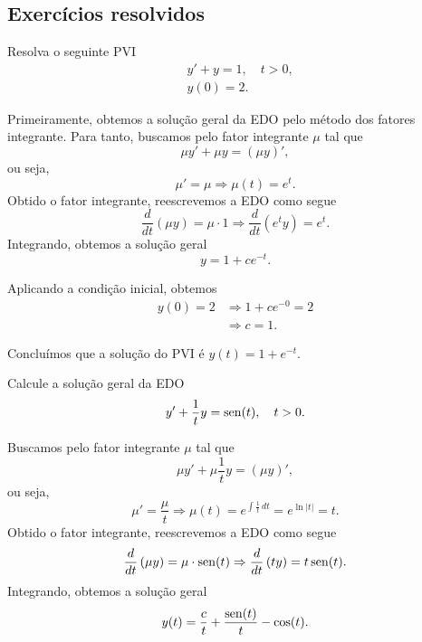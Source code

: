 \subsection*{Exercícios resolvidos}

\begin{exeresol}
  Resolva o seguinte PVI
  \begin{align}
    &y' + y = 1, \quad t>0,\\
    &y(0) = 2.
  \end{align}
\end{exeresol}
\begin{resol}
  Primeiramente, obtemos a solução geral da EDO pelo método dos fatores integrante. Para tanto, buscamos pelo fator integrante $\mu$ tal que
  \begin{equation}
    \mu y' + \mu y = (\mu y)',
  \end{equation}
  ou seja,
  \begin{equation}
    \mu' = \mu \Rightarrow \mu(t) = e^{t}.
  \end{equation}
  Obtido o fator integrante, reescrevemos a EDO como segue
  \begin{equation}
    \frac{d}{dt}\left(\mu y\right) = \mu\cdot 1 \Rightarrow \frac{d}{dt}\left(e^ty\right) = e^t.
  \end{equation}
  Integrando, obtemos a solução geral
  \begin{equation}
    y = 1 + ce^{-t}.
  \end{equation}

  Aplicando a condição inicial, obtemos
  \begin{align}
    y(0) = 2 &\Rightarrow 1 + ce^{-0} = 2 \\
             &\Rightarrow c = 1.
  \end{align}

  Concluímos que a solução do PVI é $y(t) = 1 + e^{-t}$.
\end{resol}

\begin{exeresol}
  Calcule a solução geral da EDO
  \begin{align}
    y' + \frac{1}{t}y = \operatorname{sen}(t),\quad t>0.
  \end{align}
\end{exeresol}
\begin{resol}
  Buscamos pelo fator integrante $\mu$ tal que
  \begin{equation}
    \mu y' + \mu \frac{1}{t}y = (\mu y)',
  \end{equation}
  ou seja,
  \begin{equation}
    \mu' = \frac{\mu}{t} \Rightarrow \mu(t) = e^{\int \frac{1}{t}\,dt} = e^{\ln|t|} = t.
  \end{equation}
  Obtido o fator integrante, reescrevemos a EDO como segue
  \begin{equation}
    \frac{d}{dt}\left(\mu y\right) = \mu\cdot \operatorname{sen}(t) \Rightarrow \frac{d}{dt}\left(t y\right) = t\operatorname{sen}(t).
  \end{equation}
  Integrando, obtemos a solução geral
  \begin{equation}
    y(t) = \frac{c}{t}  + \frac{\operatorname{sen}(t)}{t} - \cos(t).
  \end{equation}
\end{resol}

